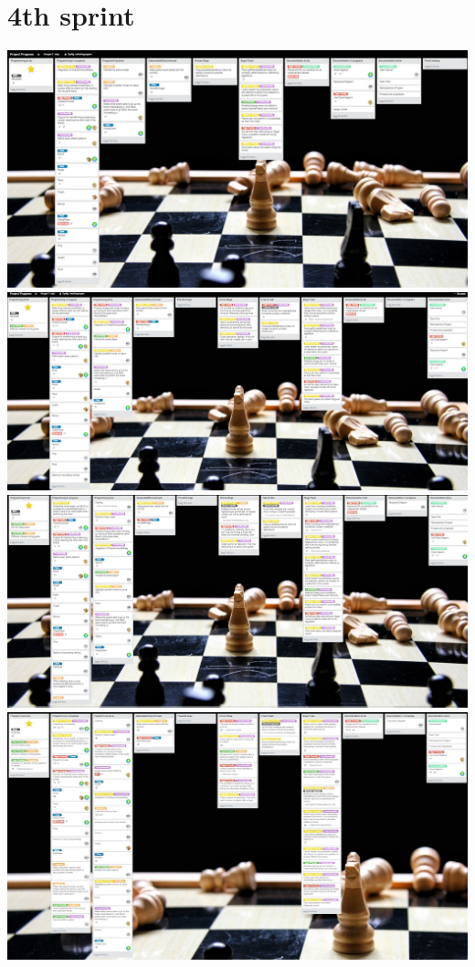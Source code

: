 \documentclass{article}
\begin{document}
\section*{4th sprint}
\includegraphics[width=16cm]{progress1.jpg} \\
\includegraphics[width=16cm]{progress2.jpg} \\
\includegraphics[width=16cm]{progress3.jpg} \\
\includegraphics[width=16cm]{progress4.jpg} \\
\end{document}
